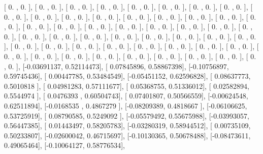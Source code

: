 \documentclass{article}
\begin{document}
       [ 0.        ,  0.        ],
       [ 0.        ,  0.        ],
       [ 0.        ,  0.        ],
       [ 0.        ,  0.        ],
       [ 0.        ,  0.        ],
       [ 0.        ,  0.        ],
       [ 0.        ,  0.        ],
       [ 0.        ,  0.        ],
       [ 0.        ,  0.        ],
       [ 0.        ,  0.        ],
       [ 0.        ,  0.        ],
       [ 0.        ,  0.        ],
       [ 0.        ,  0.        ],
       [ 0.        ,  0.        ],
       [ 0.        ,  0.        ],
       [ 0.        ,  0.        ],
       [ 0.        ,  0.        ],
       [ 0.        ,  0.        ],
       [ 0.        ,  0.        ],
       [ 0.        ,  0.        ],
       [ 0.        ,  0.        ],
       [ 0.        ,  0.        ],
       [ 0.        ,  0.        ],
       [ 0.        ,  0.        ],
       [ 0.        ,  0.        ],
       [ 0.        ,  0.        ],
       [ 0.        ,  0.        ],
       [ 0.        ,  0.        ],
       [ 0.        ,  0.        ],
       [ 0.        ,  0.        ],
       [ 0.        ,  0.        ],
       [ 0.        ,  0.        ],
       [ 0.        ,  0.        ],
       [ 0.        ,  0.        ],
       [ 0.        ,  0.        ],
       [ 0.        ,  0.        ],
       [ 0.        ,  0.        ],
       [ 0.        ,  0.        ],
       [ 0.        ,  0.        ],
       [ 0.        ,  0.        ],
       [ 0.        ,  0.        ],
       [ 0.        ,  0.        ],
       [ 0.        ,  0.        ],
       [ 0.        ,  0.        ],
       [ 0.        ,  0.        ],
       [ 0.        ,  0.        ],
       [ 0.        ,  0.        ],
       [ 0.        ,  0.        ],
       [ 0.        ,  0.        ],
       [ 0.        ,  0.        ],
       [-0.03691137,  0.52114473],
       [ 0.07845896,  0.58867398],
       [-0.10756897,  0.59745436],
       [ 0.00447785,  0.53484549],
       [-0.05451152,  0.62596828],
       [ 0.08637773,  0.5010818 ],
       [ 0.04981283,  0.57111677],
       [ 0.05368755,  0.51336012],
       [ 0.02582894,  0.5544974 ],
       [ 0.0476393 ,  0.60504743],
       [ 0.07401807,  0.50566559],
       [-0.00624548,  0.62511894],
       [-0.0168535 ,  0.4867279 ],
       [-0.08209389,  0.4818667 ],
       [-0.06106625,  0.53725919],
       [ 0.08790585,  0.5249092 ],
       [-0.05579492,  0.55675988],
       [-0.03993057,  0.56447385],
       [ 0.01443497,  0.58205783],
       [-0.03280319,  0.58944512],
       [ 0.00735109,  0.50233807],
       [-0.02600042,  0.46715697],
       [-0.10130365,  0.50678488],
       [-0.08473611,  0.49065464],
       [-0.10064127,  0.58776534],
\end{document}
